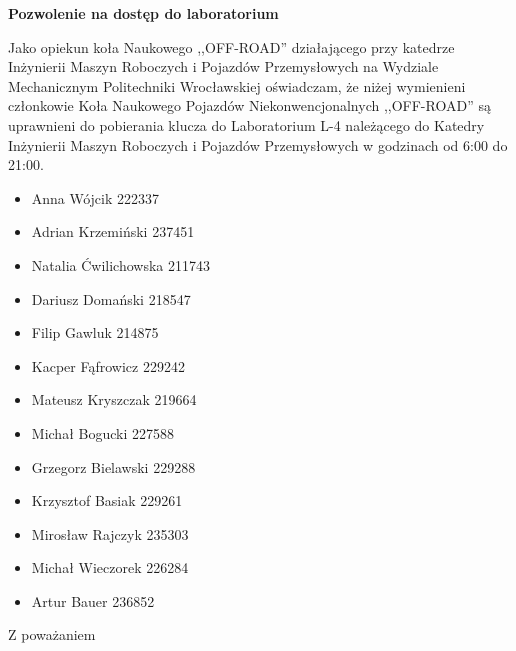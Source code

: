 \documentclass[11pt,a4paper]{letter} %
\date{Wrocław, \today}
\begin{document}
\begin{letter}{}
\opening{}

\begin{center}
  \huge
  \textbf{Pozwolenie na dostęp do laboratorium}
\end{center}

 Jako opiekun koła Naukowego ,,OFF-ROAD'' działającego przy katedrze Inżynierii Maszyn Roboczych i Pojazdów Przemysłowych na Wydziale Mechanicznym Politechniki Wrocławskiej oświadczam, że niżej wymienieni członkowie Koła Naukowego Pojazdów Niekonwencjonalnych ,,OFF-ROAD'' są uprawnieni do pobierania klucza do Laboratorium L-4 należącego do Katedry Inżynierii Maszyn Roboczych i Pojazdów Przemysłowych w godzinach od 6:00 do 21:00.
\begin{multicols}{2}
    \begin{itemize}
        \item Anna Wójcik 222337
        \item Adrian Krzemiński 237451
        \item Natalia Ćwilichowska 211743
        \item Dariusz Domański 218547
        \item Filip Gawluk 214875
        \item Kacper Fąfrowicz 229242
        \item Mateusz Kryszczak 219664
        \item Michał Bogucki 227588
        \item Grzegorz Bielawski 229288
        \item Krzysztof Basiak 229261
        \item Mirosław Rajczyk 235303
        \item Michał Wieczorek 226284
        \item Artur Bauer 236852
    \end{itemize}
\end{multicols}
\closing{Z poważaniem}

\end{letter}
\end{document}
